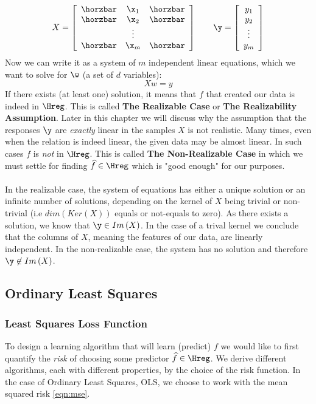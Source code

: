 $$
X =
\left[
\begin{array}{ccc}
\horzbar & \x_1 & \horzbar \\
\horzbar & \x_2 & \horzbar \\
		 & \vdots    & \\
\horzbar & \x_m & \horzbar
\end{array}
\right]\quad\quad
\y=\left[\begin{array}{c} y_1 \\ y_2 \\ \vdots \\ y_m \end{array}\right]
$$
Now we can write it as a system of $m$ independent linear equations, which we want to solve for $\w$ (a set of $d$ variables): $$ Xw=y $$ If there exists (at least one) solution, it means that $f$ that created our data is indeed in $\Hreg$. This is called \textbf{The Realizable Case} or \textbf{The Realizability Assumption}. Later in this chapter we will discuss why the assumption that the responses $\y$ are \textit{exactly} linear in the samples $X$ is not realistic. Many times, even when the relation is indeed linear, the given data may be almost linear. In such cases $f$ is \textit{not} in $\Hreg$. This is called \textbf{The Non-Realizable Case} in which we must settle for finding $\widehat{f}\in\Hreg$ which is "good enough" for our purposes.
\\
\\
In the realizable case, the system of equations has either a unique solution or an infinite number of solutions, depending on the kernel of $X$ being trivial or non-trivial (i.e $dim\left(Ker\left(X\right)\right)$ equals or not-equals to zero). As there exists a solution, we know that $\y\in Im\left(X\right)$. In the case of a trival kernel we conclude that the columns of $X$, meaning the features of our data, are linearly independent. In the non-realizable case, the system has no solution and therefore $\y\not\in Im\left(X\right)$.



\subsection{Ordinary Least Squares}
\subsubsection{Least Squares Loss Function}
To design a learning algorithm that will learn (predict) $f$ we would like to first quantify the \textit{risk} of choosing some predictor $\widehat{f}\in\Hreg$. We derive different algorithms, each with different properties, by the choice of the risk function. In the case of Ordinary Least Squares, OLS, we choose to work with the mean squared risk \eqref{eqn:mse}. 

